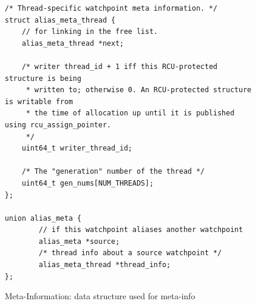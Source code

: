 \begin{figure}[htb]
\begin{lstlisting}
/* Thread-specific watchpoint meta information. */
struct alias_meta_thread {
    // for linking in the free list.
    alias_meta_thread *next;

    /* writer thread_id + 1 iff this RCU-protected structure is being
     * written to; otherwise 0. An RCU-protected structure is writable from
     * the time of allocation up until it is published using rcu_assign_pointer.
     */
    uint64_t writer_thread_id;

    /* The "generation" number of the thread */
    uint64_t gen_nums[NUM_THREADS];
};

union alias_meta {
        // if this watchpoint aliases another watchpoint
        alias_meta *source;
        /* thread info about a source watchpoint */
        alias_meta_thread *thread_info;
}; 
\end{lstlisting}
\caption{Meta-Information: data structure used for meta-info}\label{fig:metainfo}
\end{figure}



